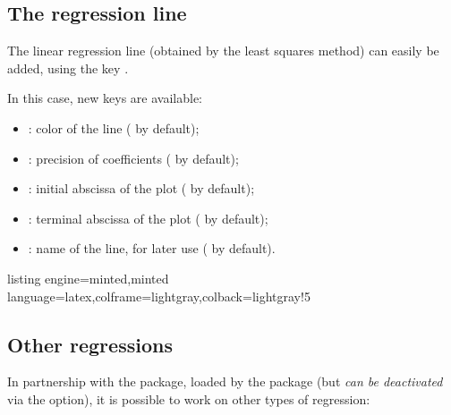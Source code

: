 \documentclass[11pt,a4paper]{ltxdoc}
\begin{document}
\subsection{The regression line}\label{reglin}

The linear regression line (obtained by the least squares method) can easily be added, using the key .

\smallskip

In this case, new keys are available:

\smallskip

\begin{itemize}
	\item {}: color of the line ( by default);
	\item {}: precision of coefficients ( by default);
	\item {}: initial abscissa of the plot ( by default);
	\item {}: terminal abscissa of the plot ( by default);
	\item {}: name of the line, for later use ( by default).
\end{itemize}

\begin{tcblisting}{listing engine=minted,minted language=latex,colframe=lightgray,colback=lightgray!5}
\begin{GraphTikz}%
	[x=0.075cm,y=0.03cm,Xmin=0,Xmax=160,Xgrid=20,Xgrids=10,
	Origy=250,Ymin=250,Ymax=400,Ygrid=25,Ygrids=5]
\end{GraphTikz}
\end{tcblisting}

\subsection{Other regressions}\label{regressions}

In partnership with the  package, loaded by the package (but \textit{can be deactivated} via the \MontreCode{[noxintreg]} option), it is possible to work on other types of regression:
\end{document}
